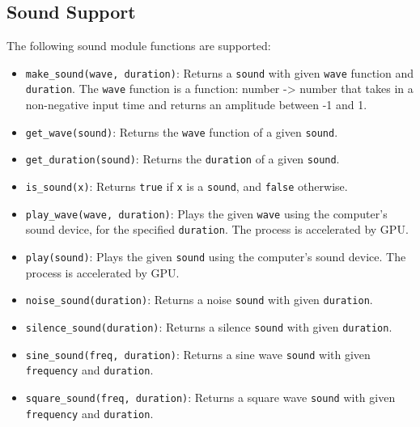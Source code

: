 \subsection*{Sound Support}

The following sound module functions are supported:

\begin{itemize}

\item \lstinline{make_sound(wave, duration)}: Returns a \lstinline{sound} with given \lstinline{wave} function and \lstinline{duration}. The \lstinline{wave} function is a function: number -> number that takes in a non-negative input time and returns an amplitude between -1 and 1.

\item \lstinline{get_wave(sound)}: Returns the \lstinline{wave} function of a given \lstinline{sound}.

\item \lstinline{get_duration(sound)}: Returns the \lstinline{duration} of a given \lstinline{sound}.

\item \lstinline{is_sound(x)}: Returns \lstinline{true} if \lstinline{x} is a \lstinline{sound}, and \lstinline{false} otherwise.

\item \lstinline{play_wave(wave, duration)}: Plays the given \lstinline{wave} using the computer's sound device, for the specified \lstinline{duration}. The process is accelerated by GPU.

\item \lstinline{play(sound)}: Plays the given \lstinline{sound} using the computer's sound device. The process is accelerated by GPU.

\item \lstinline{noise_sound(duration)}: Returns a noise \lstinline{sound} with given \lstinline{duration}.

\item \lstinline{silence_sound(duration)}: Returns a silence \lstinline{sound} with given \lstinline{duration}.

\item \lstinline{sine_sound(freq, duration)}: Returns a sine wave \lstinline{sound} with given \lstinline{frequency} and \lstinline{duration}.

\item \lstinline{square_sound(freq, duration)}: Returns a square wave \lstinline{sound} with given \lstinline{frequency} and \lstinline{duration}.


\end{itemize}

